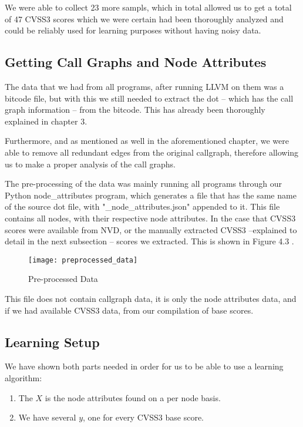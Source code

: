 We were able to collect 23 more sampls, which in total allowed us to get a total of 47 CVSS3 scores which we were certain had been thoroughly analyzed and could be reliably used for learning purposes without having noisy data.

\subsection{Getting Call Graphs and Node Attributes}

The data that we had from all programs, after running LLVM on them was a bitcode file, but with this we still needed to extract the dot -- which has the call graph information -- from the bitcode. This has already been thoroughly explained in chapter 3.

Furthermore, and as mentioned as well in the aforementioned chapter, we were able to remove all redundant edges from the original callgraph, therefore allowing us to make a proper analysis of the call graphs.

The pre-processing of the data was mainly running all programs through our Python node\_attributes program, which generates a file that has the same name of the source dot file, with "\_node\_attributes.json" appended to it. This file contains all nodes, with their respective node attributes. In the case that CVSS3 scores were available from NVD, or the manually extracted CVSS3 --explained to detail in the next subsection -- scores we extracted. This is shown in Figure  4.3 .

\begin{figure}[H]
	\caption{Pre-processed Data}
	\centering
	\texttt{[image: preprocessed\_data]}
\end{figure}

This file does not contain callgraph data, it is only the node attributes data, and if we had available CVSS3 data, from our compilation of base scores.

\subsection{Learning Setup}

We have shown both parts needed in order for us to be able to use a learning algorithm:

\begin{enumerate}
	\item The $X$ is the node attributes found on a per node basis.
	\item We have several $y$, one for every CVSS3 base score. 
\end{enumerate}

